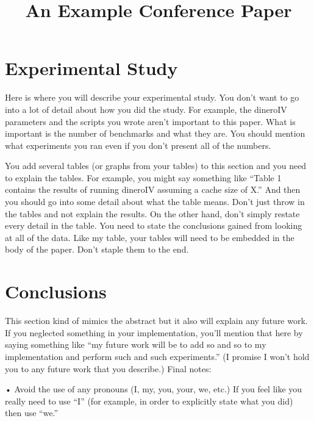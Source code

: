 \documentclass[conference]{IEEEtran}
\begin{document}
\title{An Example Conference Paper}

\author{
\IEEEauthorblockA{%
~%
}%
}
\maketitle

\begin{abstract}

\end{abstract}

\section{Experimental Study}
Here is where you will describe your experimental study. You don't want to go into a lot of detail about how you did the study. For example, the dineroIV parameters and the scripts you wrote aren't important to this paper. What is important is the number of benchmarks and what they are. You should mention what experiments you ran even if you don't present all of the numbers.

You add several tables (or graphs from your tables) to this section and you need to explain the tables. For example, you might say something like ``Table 1 contains the results of running dineroIV assuming a cache size of X.'' And then you should go into some detail about what the table means. Don't just throw in the tables and not explain the results. On the other hand, don't simply restate every detail in the table. You need to state the conclusions gained from looking at all of the data. Like my table, your tables will need to be embedded in the body of the paper. Don't staple them to the end.

\section{Conclusions}
This section kind of mimics the abstract but it also will explain any future work. If you neglected something in your implementation, you'll mention that here by saying something like ``my future work will be to add so and so to my implementation and perform such and such experiments.'' (I promise I won't hold you to any future work that you describe.) Final notes:

• Avoid the use of any pronouns (I, my, you, your, we, etc.) If you feel like you really need to use ``I'' (for example, in order to explicitly state what you did) then use ``we.''
\end{document}
